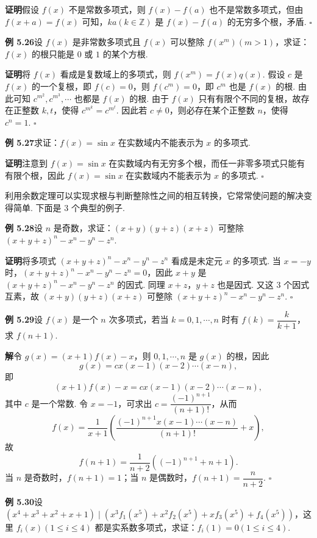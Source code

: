 \documentclass[UTF8,12pt,a4paper,fontset=fandol]{ctexart}
\begin{document}
\noindent\textbf{证明}\quad 假设 $f(x)$ 不是常数多项式，则 $f(x)-f(a)$ 也不是常数多项式，但由 $f(x+a)=f(x)$ 可知，$ka(k\in\mathbb{Z})$ 是 $f(x)-f(a)$ 的无穷多个根，矛盾. \hfill $\square$

\noindent\textbf{例 5.26}\quad 设 $f(x)$ 是非常数多项式且 $f(x)$ 可以整除 $f(x^m)(m>1)$，求证：$f(x)$ 的根只能是 $0$ 或 $1$ 的某个方根.

\noindent\textbf{证明}\quad 将 $f(x)$ 看成是复数域上的多项式，则 $f(x^m)=f(x)q(x)$. 假设 $c$ 是 $f(x)$ 的一个复根，即 $f(c)=0$，则 $f(c^m)=0$，即 $c^m$ 也是 $f(x)$ 的根. 由此可知 $c^{m^2},c^{m^3},\cdots$ 也都是 $f(x)$ 的根. 由于 $f(x)$ 只有有限个不同的复根，故存在正整数 $k,t$，使得 $c^{m^k}=c^{m^t}$. 因此若 $c\ne0$，则必存在某个正整数 $n$，使得 $c^n=1$. \hfill $\square$

\noindent\textbf{例 5.27}\quad 求证：$f(x)=\sin x$ 在实数域内不能表示为 $x$ 的多项式.

\noindent\textbf{证明}\quad 注意到 $f(x)=\sin x$ 在实数域内有无穷多个根，而任一非零多项式只能有有限个根，因此 $f(x)=\sin x$ 在实数域内不能表示为 $x$ 的多项式. \hfill $\square$

利用余数定理可以实现求根与判断整除性之间的相互转换，它常常使问题的解决变得简单. 下面是 3 个典型的例子.

\noindent\textbf{例 5.28}\quad 设 $n$ 是奇数，求证：$(x+y)(y+z)(x+z)$ 可整除 $(x+y+z)^n-x^n-y^n-z^n$.

\noindent\textbf{证明}\quad 将多项式 $(x+y+z)^n-x^n-y^n-z^n$ 看成是未定元 $x$ 的多项式. 当 $x=-y$ 时，$(x+y+z)^n-x^n-y^n-z^n=0$，因此 $x+y$ 是 $(x+y+z)^n-x^n-y^n-z^n$ 的因式. 同理 $x+z$，$y+z$ 也是因式. 又这 3 个因式互素，故 $(x+y)(y+z)(x+z)$ 可整除 $(x+y+z)^n-x^n-y^n-z^n$. \hfill $\square$

\noindent\textbf{例 5.29}\quad 设 $f(x)$ 是一个 $n$ 次多项式，若当 $k=0,1,\cdots,n$ 时有 $f(k)=\dfrac{k}{k+1}$，求 $f(n+1)$.

\noindent\textbf{解}\quad 令 $g(x)=(x+1)f(x)-x$，则 $0,1,\cdots,n$ 是 $g(x)$ 的根，因此
\[
g(x)=cx(x-1)(x-2)\cdots(x-n),
\]
即
\[
(x+1)f(x)-x=cx(x-1)(x-2)\cdots(x-n),
\]
其中 $c$ 是一个常数. 令 $x=-1$，可求出 $c=\dfrac{(-1)^{n+1}}{(n+1)!}$，从而
\[
f(x)=\frac{1}{x+1}\left(\frac{(-1)^{n+1}x(x-1)\cdots(x-n)}{(n+1)!}+x\right),
\]
故
\[
f(n+1)=\frac{1}{n+2}\left((-1)^{n+1}+n+1\right).
\]
当 $n$ 是奇数时，$f(n+1)=1$；当 $n$ 是偶数时，$f(n+1)=\dfrac{n}{n+2}$. \hfill $\square$

\noindent\textbf{例 5.30}\quad 设 $(x^4+x^3+x^2+x+1)\mid (x^3f_1(x^5)+x^2f_2(x^5)+xf_3(x^5)+f_4(x^5))$，这里 $f_i(x)(1\le i\le4)$ 都是实系数多项式，求证：$f_i(1)=0(1\le i\le4)$.
\end{document}
